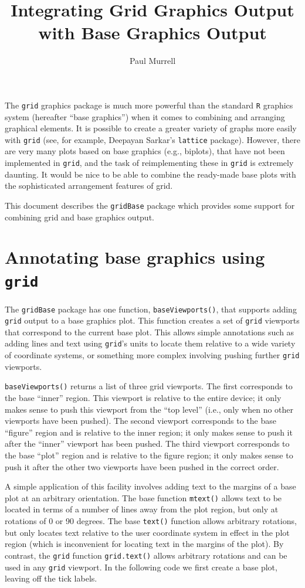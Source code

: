 \documentclass[a4paper]{article}
\title{Integrating Grid Graphics Output \\ with Base Graphics Output}
\author{Paul Murrell}
\newcommand{\grid}{{\tt grid}}
\newcommand{\gridBase}{{\tt gridBase}}
\newcommand{\lattice}{{\tt lattice}}
\newcommand{\R}{{\tt R}}
\begin{document}
\maketitle

The \grid{} graphics package\cite{Rnews:Murrell:2002}
 is much more powerful than the standard \R{} graphics system
(hereafter ``base 
graphics'') when it comes to combining and arranging graphical elements.
It is possible to create a greater variety of graphs more easily with 
\grid{} (see, for example, Deepayan Sarkar's \lattice{} 
package\cite{Rnews:Sarkar:2002}).
However,  there are very many plots based on base graphics (e.g., 
biplots), that have not been implemented in \grid{}, and the
task of reimplementing these in \grid{} is extremely daunting.
It would be nice to be able to combine the 
ready-made base plots with the sophisticated arrangement features
of grid.

This document describes the \gridBase{} package which provides
 some support for combining grid and base
graphics output.

\section*{Annotating base graphics using \grid{}}

The \gridBase{} package has one function, \verb|baseViewports()|, 
that supports 
adding \grid{} output to a base graphics plot.
This function creates a set of \grid{} 
viewports that correspond to the current
base plot.
This allows simple annotations such as adding lines and text using \grid{}'s
units to locate them relative to 
a wide variety of coordinate systems, or something
more complex involving
pushing further \grid{} viewports.

{\tt baseViewports()} returns a list of three grid viewports.  The first 
corresponds to the base ``inner'' region.  This viewport is relative to
 the entire device; it only makes sense to push this viewport
from the ``top level'' (i.e., only when no other viewports have been 
pushed).
The second viewport corresponds to the base ``figure'' region
and is relative to the inner region;  it only makes sense to push it
after the ``inner'' viewport has been pushed.  The third 
viewport corresponds to the 
base ``plot'' region  and is relative to the figure region;  it only
makes sense to push it after the other two viewports have been pushed in the
correct order.  

A simple application of this facility involves adding text to 
the margins of a base plot at an arbitrary orientation.  The base
function \verb|mtext()| allows text to be located  in terms of a number
of lines away from the plot region, but only at rotations of 0 or
90 degrees.  The base \verb|text()| function allows arbitrary rotations,
but only locates text relative to the user coordinate system in effect
in the plot region (which is inconvenient for locating text in the
margins of the plot).  By contrast, the \grid{} function 
\verb|grid.text()| allows arbitrary rotations and can be used in 
any \grid{} viewport.  In the following code we first create a base plot,
leaving off the tick labels. 
\end{document}
